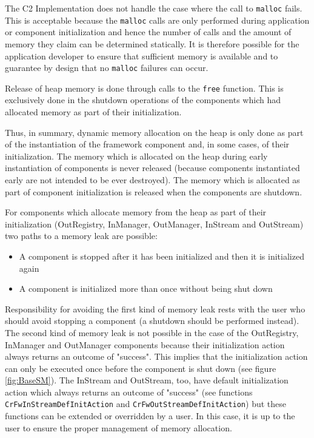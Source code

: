 \documentclass{pnp_article}
\begin{document}
The C2 Implementation does not handle the case where the call to \texttt{malloc} fails.  This is acceptable because the \texttt{malloc} calls are only performed during application or component initialization and hence the number of calls and the amount of memory they claim can be determined statically. It is therefore possible for the application developer to ensure that sufficient memory is available and to guarantee by design that no \texttt{malloc} failures can occur.

Release of heap memory is done through calls to the \texttt{free} function. This is exclusively done in the shutdown operations of the components which had allocated memory as part of their initialization. 

Thus, in summary, dynamic memory allocation on the heap is only done as part of the instantiation of the framework component and, in some cases, of their initialization. The memory which is allocated on the heap during early instantiation of components is never released (because components instantiated early are not intended to be ever destroyed). The memory which is allocated as part of component initialization is released when the components are shutdown.

For components which allocate memory from the heap as part of their initialization (OutRegistry, InManager, OutManager, InStream and OutStream) two paths to a memory leak are possible:

\begin{itemize}
\item A component is stopped after it has been initialized and then it is initialized again
\item A component is initialized more than once without being shut down
\end{itemize}

Responsibility for avoiding the first kind of memory leak rests with the user who should avoid stopping a component (a shutdown should be performed instead). The second kind of memory leak is not possible in the case of the OutRegistry, InManager and OutManager components because their initialization action always returns an outcome of "success". This implies that the initialization action can only be executed once before the component is shut down (see figure \ref{fig:BaseSM}). The InStream and OutStream, too, have default initialization action which always returns an outcome of "success" (see functions \texttt{CrFwInStreamDefInitAction} and \texttt{CrFwOutStreamDefInitAction}) but these functions can be extended or overridden by a user. In this case, it is up to the user to ensure the proper management of memory allocation. 
\end{document}
